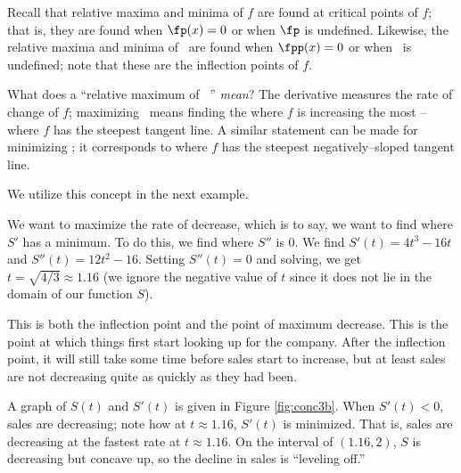 Recall that relative maxima and minima of $f$ are found at critical points of $f$; that is, they are found when $\fp(x)=0$ or when $\fp$ is undefined. Likewise, the relative maxima and minima of \fp\ are found when $\fpp(x)=0$ or when \fpp\ is undefined; note that these are the inflection points of $f$. 

What does a ``relative maximum of \fp\ '' \textit{mean}? The derivative measures the rate of change of $f$; maximizing \fp\ means finding the where $f$ is increasing the most -- where $f$ has the steepest tangent line. A similar statement can be made for minimizing \fp; it corresponds to where $f$ has the steepest negatively--sloped tangent line.

We utilize this concept in the next example.\\

\enlargethispage{\baselineskip}

{We want to maximize the rate of decrease, which is to say, we want to find where $S'$ has a minimum.  To do this, we find where $S''$ is 0.  We find $S'(t)=4t^3-16t$ and $S''(t)=12t^2-16$.  Setting $S''(t)=0$ and solving, we get $t=\sqrt{4/3}\approx 1.16$ (we ignore the negative value of $t$ since it does not lie in the domain of our function $S$).

This is both the inflection point and the point of maximum decrease.  This is the point at which things first start looking up for the company.  After the inflection point, it will still take some time before sales start to increase, but at least sales are not decreasing quite as quickly as they had been.

A graph of $S(t)$ and $S'(t)$ is given in Figure \ref{fig:conc3b}. When $S'(t)<0$, sales are decreasing; note how at $t\approx 1.16$, $S'(t)$ is minimized. That is, sales are decreasing at the fastest rate at $t\approx 1.16$.  On the interval of $(1.16,2)$, $S$ is decreasing but concave up, so the decline in sales is ``leveling off.''
}\\


